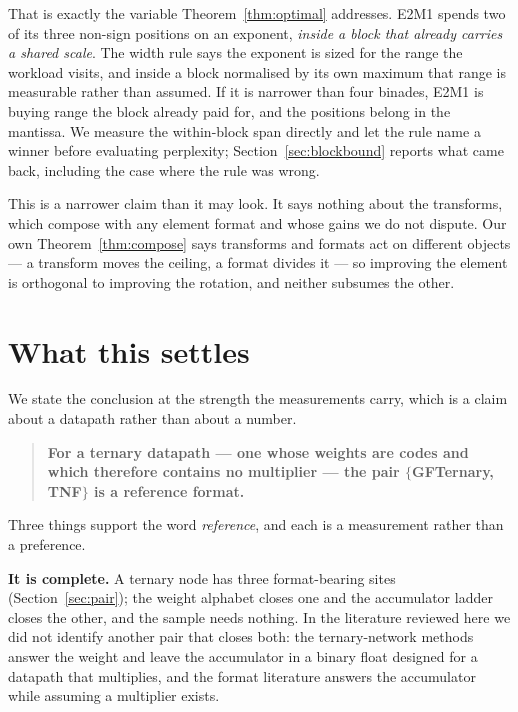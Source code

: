 That is exactly the variable Theorem~\ref{thm:optimal} addresses. E2M1 spends two
of its three non-sign positions on an exponent, \emph{inside a block that already
carries a shared scale}. The width rule says the exponent is sized for the range
the workload visits, and inside a block normalised by its own maximum that range
is measurable rather than assumed. If it is narrower than four binades, E2M1 is
buying range the block already paid for, and the positions belong in the mantissa.
We measure the within-block span directly and let the rule name a winner before
evaluating perplexity; Section~\ref{sec:blockbound} reports what came back,
including the case where the rule was wrong.

This is a narrower claim than it may look. It says nothing about the transforms,
which compose with any element format and whose gains we do not dispute. Our own
Theorem~\ref{thm:compose} says transforms and formats act on different objects ---
a transform moves the ceiling, a format divides it --- so improving the element is
orthogonal to improving the rotation, and neither subsumes the other.


\section{What this settles}


\label{sec:settles}

We state the conclusion at the strength the measurements carry, which is a claim
about a datapath rather than about a number.

\begin{quote}
\textbf{For a ternary datapath --- one whose weights are codes and which therefore
contains no multiplier --- the pair $\{$GFTernary, TNF$\}$ is a reference format.}
\end{quote}

Three things support the word \emph{reference}, and each is a measurement rather
than a preference.

\textbf{It is complete.} A ternary node has three format-bearing sites
(Section~\ref{sec:pair}); the weight alphabet closes one and the accumulator
ladder closes the other, and the sample needs nothing. In the literature reviewed
here we did not identify another pair that closes both: the ternary-network methods answer the weight and leave
the accumulator in a binary float designed for a datapath that multiplies, and the
format literature answers the accumulator while assuming a multiplier exists.

